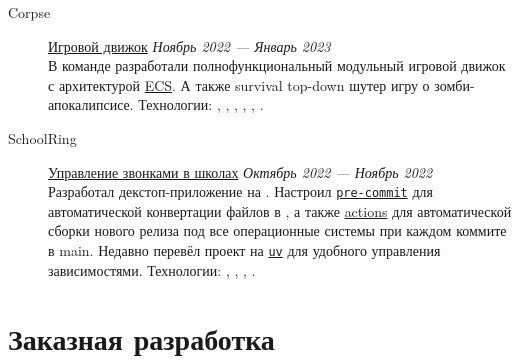 \documentclass[margin,line]{resume}
\begin{document}
\begin{resume}
\begin{description}
      \vspace{3mm}

    \item[Corpse]\small{\href{https://github.com/corpse-inc/corpse}{Игровой
        движок}
      \hfill \textsl{Ноябрь 2022 — Январь 2023\vspace{1mm}}}\\
      В команде разработали полнофункциональный модульный
      игровой движок с архитектурой
      \href{https://en.wikipedia.org/wiki/Entity_component_system#:~:text=Entity%E2%80%93component%E2%80%93system%20(ECS,Entity%E2%80%93Component%E2%80%93System%20layout.}{ECS}.
        А также survival top-down шутер игру о зомби-апокалипсисе.
        Технологии:
        , ,
        , , ,
        .

        \vspace{3mm}

      \item[SchoolRing]\small{\href{https://github.com/alchemmist/school-ring}{Управление
          звонками в школах}
          \hfill
        \textsl{Октябрь 2022 — Ноябрь 2022\vspace{1mm}}}\\
        Разработал декстоп-приложение на . Настроил
        \href{https://github.com/alchemmist/school-ring/blob/main/.pre-commit-config.yaml}{\texttt{pre-commit}}
        для
        автоматической конвертации  файлов в
        , а также
        \href{https://github.com/alchemmist/school-ring/blob/main/.github/workflows/build.yaml}{actions}
        для автоматической сборки нового релиза под все
        операционные системы при каждом коммите в main. Недавно перевёл
        проект на \href{https://astral.sh/blog/uv}{\texttt{uv}} для
        удобного управления зависимостями.
        Технологии:
        , ,
        , .

    \end{description}

    \section{\mysidestyle Заказная разработка}\vspace{2mm}


\end{resume}
\end{document}
